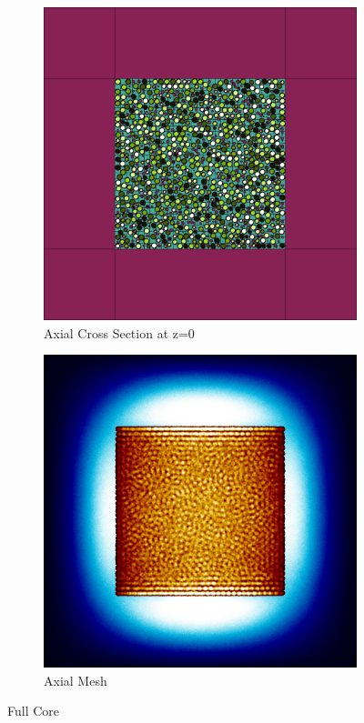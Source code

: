 \begin{figure}[H]
\begin{subfigure}{0.45\textwidth}
  \includegraphics[width=0.95\linewidth]{figures/control/control-v}
  \caption{Axial Cross Section at z=0 }
  \label{fig:controlc}
\end{subfigure}
%
\begin{subfigure}{0.45\textwidth}
  \includegraphics[width=0.95\linewidth]{figures/control/control-vm}
  \caption{Axial Mesh}
  \label{fig:controld}
\end{subfigure}
%
\caption{Full Core}
\label{fig:control}
\end{figure}